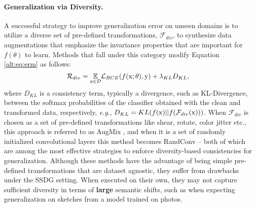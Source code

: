 \paragraph{Generalization via Diversity.} A successful strategy to improve generalization error on unseen domains is to utilize a diverse set of pre-defined transformations, $\mathcal{F}_{div}$, to synthesize data augmentations that emphasize the invariance properties that are important for $f(\theta)$ to learn. Methods that fall under this category modify Equation \ref{alt:eq:erm} as follows: 
\begin{equation}
    \label{alt:eq:div_erm}
    \mathcal{R}_{div} = \underset{\operatorname{\mathrm{x}}\in\mathcal{D}}{\operatorname*{\mathbb{E}}} \mathcal{L}_{BCE}(f(\operatorname{\mathrm{x}}; \theta), \operatorname{\mathrm{y}}) + \lambda_{KL} D_{KL},
\end{equation}
where $D_{KL}$ is a consistency term, typically a divergence, such as KL-Divergence, between the softmax probabilities of the classifier obtained with the clean and transformed data, respectively, \textit{e.g.}, $D_{KL} = KL(f(\operatorname{\mathrm{x}}) ||f(\mathcal{F}_{div}(\operatorname{\mathrm{x}})))$. 
When $\mathcal{F}_{div}$ is chosen as a set of pre-defined transformations like shear, rotate, color jitter etc., this approach is referred to as AugMix \citep{hendrycks2019augmix}, and when it is a set of randomly initialized convolutional layers this method becomes RandConv \citep{xu2020robust} -- both of which are among the most effective strategies to enforce diversity-based consistencies for generalization.
Although these methods have the advantage of being simple pre-defined transformations that are dataset agnostic, they suffer from drawbacks under the SSDG setting.
When executed on their own, they may not capture sufficient diversity in terms of \textbf{large} semantic shifts, such as when expecting generalization on sketches from a model trained on photos.

